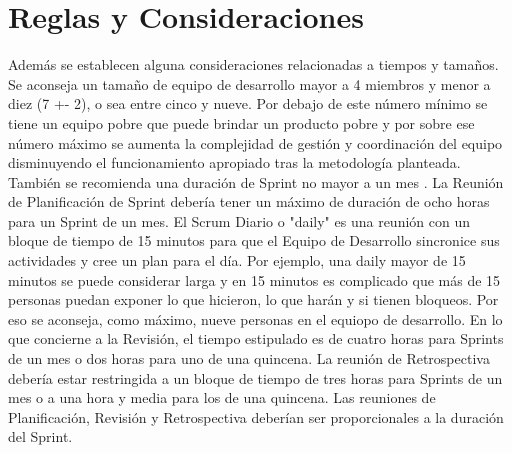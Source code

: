 \section{Reglas y Consideraciones}

Además se establecen alguna consideraciones relacionadas a tiempos y tamaños. Se aconseja un tamaño de equipo de desarrollo mayor a 4 miembros y menor a diez (7 +- 2), o sea entre cinco y nueve. Por debajo de este número mínimo se tiene un equipo pobre que puede brindar un producto pobre y por sobre ese número máximo se aumenta la complejidad de gestión y coordinación del equipo disminuyendo el funcionamiento apropiado tras la metodología planteada. También se recomienda una duración de Sprint no mayor a un mes \cite{Ken-Jeff-2013}. La Reunión de Planificación de Sprint debería tener un máximo de duración de ocho horas para un Sprint de un mes. El Scrum Diario o "daily" es una reunión con un bloque de tiempo de 15 minutos para que el Equipo de Desarrollo sincronice sus actividades y cree un plan para el día. Por ejemplo, una daily mayor de 15 minutos se puede considerar larga y en 15 minutos es complicado que más de 15 personas puedan exponer lo que hicieron, lo que harán y si tienen bloqueos. Por eso se aconseja, como máximo, nueve personas en el equiopo de desarrollo. En lo que concierne a la Revisión, el tiempo estipulado es de cuatro horas para Sprints de un mes o dos horas para uno de una quincena. La reunión de Retrospectiva  debería estar restringida a un bloque de tiempo de tres horas para Sprints de un mes o  a una hora y media para los de una quincena. Las reuniones de Planificación, Revisión y Retrospectiva deberían ser proporcionales a la duración del Sprint.
